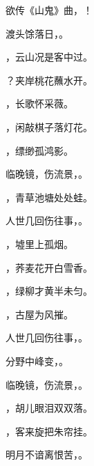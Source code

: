 \documentclass[12pt, a4paper, addpoints]{exam}
\begin{document}
\begin{questions}
\question[1] 欲传《山鬼》曲，\uline{\qquad\qquad\qquad}！

\question[1] 渡头馀落日，\uline{\qquad\qquad\qquad}。

\question[1] \uline{\qquad\qquad\qquad}，云山况是客中过。

\question[1] \uline{\qquad\qquad\qquad}？夹岸桃花蘸水开。

\question[1] \uline{\qquad\qquad\qquad}，长歌怀采薇。

\question[1] \uline{\qquad\qquad\qquad}，闲敲棋子落灯花。

\question[1] \uline{\qquad\qquad\qquad}，缥缈孤鸿影。

\question[1] 临晚镜，伤流景，\uline{\qquad\qquad\qquad}。

\question[1] \uline{\qquad\qquad\qquad}，青草池塘处处蛙。

\question[1] 人世几回伤往事，\uline{\qquad\qquad\qquad}。

\question[1] \uline{\qquad\qquad\qquad}，墟里上孤烟。

\question[1] \uline{\qquad\qquad\qquad}，荞麦花开白雪香。

\question[1] \uline{\qquad\qquad\qquad}，绿柳才黄半未匀。

\question[1] \uline{\qquad\qquad\qquad}，古屋为风摧。

\question[1] 人世几回伤往事，\uline{\qquad\qquad\qquad}。

\question[1] 分野中峰变，\uline{\qquad\qquad\qquad}。

\question[1] 临晚镜，伤流景，\uline{\qquad\qquad\qquad}。

\question[1] \uline{\qquad\qquad\qquad}，胡儿眼泪双双落。

\question[1] \uline{\qquad\qquad\qquad}，客来旋把朱帘挂。

\question[1] 明月不谙离恨苦，\uline{\qquad\qquad\qquad}。

\end{questions}

\hspace{5cm}
\end{document}
